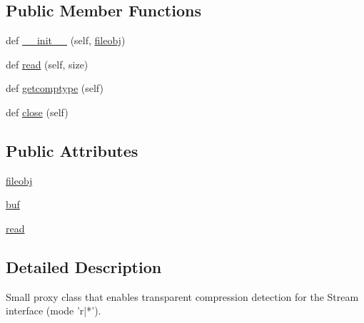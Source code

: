 \subsection*{Public Member Functions}
\begin{DoxyCompactItemize}
\item 
def \hyperlink{classpip_1_1__vendor_1_1distlib_1_1__backport_1_1tarfile_1_1__StreamProxy_ae5fabc04f01b16d60dae892a9e0c79ed}{\+\_\+\+\_\+init\+\_\+\+\_\+} (self, \hyperlink{classpip_1_1__vendor_1_1distlib_1_1__backport_1_1tarfile_1_1__StreamProxy_a7fd1a962c12244f0542628ae6f12c786}{fileobj})
\item 
def \hyperlink{classpip_1_1__vendor_1_1distlib_1_1__backport_1_1tarfile_1_1__StreamProxy_a282a90583b94ab0c8dbce1c40184d446}{read} (self, size)
\item 
def \hyperlink{classpip_1_1__vendor_1_1distlib_1_1__backport_1_1tarfile_1_1__StreamProxy_a10a2b89bc41d18883ea9e8d36c9582ba}{getcomptype} (self)
\item 
def \hyperlink{classpip_1_1__vendor_1_1distlib_1_1__backport_1_1tarfile_1_1__StreamProxy_ada0a8b99ad484a712f7bbc97a628fdc6}{close} (self)
\end{DoxyCompactItemize}
\subsection*{Public Attributes}
\begin{DoxyCompactItemize}
\item 
\hyperlink{classpip_1_1__vendor_1_1distlib_1_1__backport_1_1tarfile_1_1__StreamProxy_a7fd1a962c12244f0542628ae6f12c786}{fileobj}
\item 
\hyperlink{classpip_1_1__vendor_1_1distlib_1_1__backport_1_1tarfile_1_1__StreamProxy_a170c870f20af4d332de90bb97ea5b516}{buf}
\item 
\hyperlink{classpip_1_1__vendor_1_1distlib_1_1__backport_1_1tarfile_1_1__StreamProxy_a4ace6a133ec118b8d1367631b322c936}{read}
\end{DoxyCompactItemize}


\subsection{Detailed Description}
\begin{DoxyVerb}Small proxy class that enables transparent compression
   detection for the Stream interface (mode 'r|*').
\end{DoxyVerb}
 


